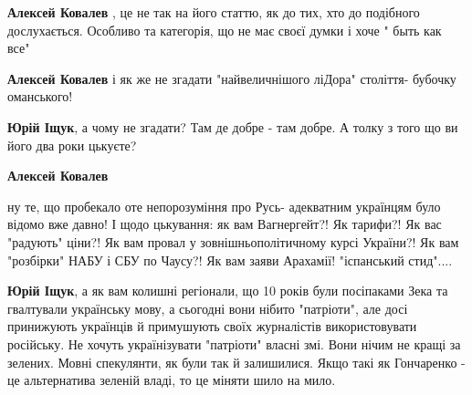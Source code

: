 \begin{itemize}
\begin{itemize}
 
\textbf{Алексей Ковалев} , це не так на його статтю, як до тих, хто до подібного дослухається. Особливо та категорія, що не має своєї думки і хоче " быть как все"

 
\textbf{Алексей Ковалев} і як же не згадати "найвеличнішого ліДора" століття- бубочку оманського!

 
\textbf{Юрій Іщук}, а чому не згадати? Там де добре - там добре. А толку з того що ви його два роки цькуєте?

 
\textbf{Алексей Ковалев} 

ну те, що пробекало оте непорозуміння про Русь- адекватним українцям було
відомо вже давно! І щодо цькування: як вам Вагнергейт?! Як тарифи?! Як вас
"радують" ціни?! Як вам провал у зовнішньополітичному курсі України?! Як вам
"розбірки" НАБУ і СБУ по Чаусу?! Як вам заяви Арахамії! "іспанський стид"....


 
\textbf{Юрій Іщук}, а як вам колишні регіонали, що 10 років були посіпаками
Зека та гвалтували українську мову, а сьогодні вони нібито "патріоти", але досі
принижують українців й примушують своїх журналістів використовувати російську.
Не хочуть українізувати "патріоти" власні змі. Вони нічим не кращі за зелених.
Мовні спекулянти, як були так й залишилися. Якщо такі як Гончаренко - це
альтернатива зеленій владі, то це міняти шило на мило.


\end{itemize}
\end{itemize}
